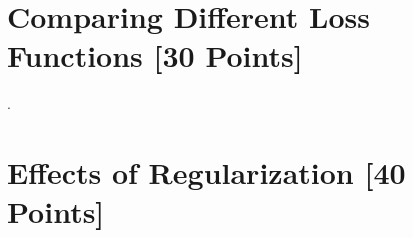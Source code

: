 \newif\ifshowsolutions
\showsolutionstrue







\pagestyle{fancy}



\section{Comparing Different Loss Functions [30 Points]}

\problem[3] 

\begin{solution}
\end{solution}

\newpage
\problem[9] 

\begin{solution}
 
\end{solution}

\newpage
\problem[9] 

\begin{solution}

\end{solution}

\newpage
\problem[4] 

\begin{solution}

\end{solution}


\newpage
\problem[5] .

\begin{solution}

\end{solution}


\newpage
\section{Effects of Regularization [40 Points]}

\problem[4]

\begin{solution}

\end{solution}


